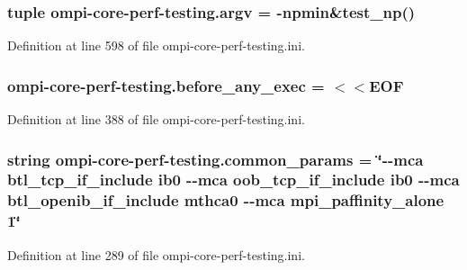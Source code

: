 \hypertarget{namespaceompi-core-perf-testing_a78614606eb674f088265f2d238b92074}{
\subsubsection[{argv}]{\setlength{\rightskip}{0pt plus 5cm}tuple ompi-\/core-\/perf-\/testing.\-argv = -\/npmin\&test\-\_\-np()}}\label{namespaceompi-core-perf-testing_a78614606eb674f088265f2d238b92074}


Definition at line 598 of file ompi-\/core-\/perf-\/testing.\-ini.

\hypertarget{namespaceompi-core-perf-testing_a9a129769c3562f66e1c8657a148858b6}{
\subsubsection[{before\-\_\-any\-\_\-exec}]{\setlength{\rightskip}{0pt plus 5cm}ompi-\/core-\/perf-\/testing.\-before\-\_\-any\-\_\-exec = $<$$<$E\-O\-F}}\label{namespaceompi-core-perf-testing_a9a129769c3562f66e1c8657a148858b6}


Definition at line 388 of file ompi-\/core-\/perf-\/testing.\-ini.

\hypertarget{namespaceompi-core-perf-testing_a00f59b40a472bd6d479927e1bce80827}{
\subsubsection[{common\-\_\-params}]{\setlength{\rightskip}{0pt plus 5cm}string ompi-\/core-\/perf-\/testing.\-common\-\_\-params = \char`\"{}-\/-\/mca btl\-\_\-tcp\-\_\-if\-\_\-include ib0 -\/-\/{\bf mca} oob\-\_\-tcp\-\_\-if\-\_\-include ib0 -\/-\/{\bf mca} btl\-\_\-openib\-\_\-if\-\_\-include mthca0 -\/-\/{\bf mca} mpi\-\_\-paffinity\-\_\-alone 1\char`\"{}}}\label{namespaceompi-core-perf-testing_a00f59b40a472bd6d479927e1bce80827}


Definition at line 289 of file ompi-\/core-\/perf-\/testing.\-ini.

